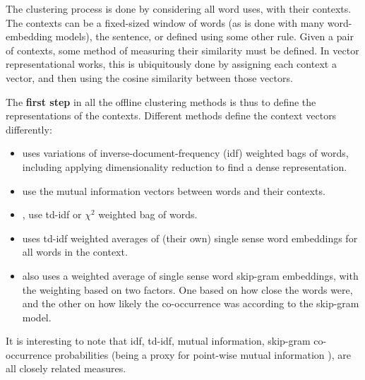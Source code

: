 \documentclass[12pt,parskip]{komatufte}
\begin{document}
The clustering process is done by considering all word uses, with their contexts.
The contexts can be a fixed-sized window of words (as is done with many word-embedding models), the sentence, or defined using some other rule.
Given a pair of contexts, some method of measuring their similarity must be defined.
In vector representational works, this is ubiquitously done by assigning each context a vector, and then using the cosine similarity between those vectors.

The \textbf{first step} in all the offline clustering methods is thus to define the representations of the contexts.
Different methods define the context vectors differently:
\begin{itemize}
\item \textcite{Schutze:1998wordsenseclustering} uses variations of inverse-document-frequency (idf) weighted bags of words, including applying dimensionality reduction to find a dense representation.
\item \textcite{pantel2002WSI} use the mutual information vectors between words and their contexts.
\item \textcite{Reisinger2010}, use td-idf or $\chi^2$ weighted bag of words.
\item {} uses td-idf weighted averages of (their own) single sense word embeddings for all words in the context.
\item  {} also uses a weighted average of single sense word skip-gram embeddings, with the weighting based on two factors. One based on how close the words were, and the other on how likely the co-occurrence was according to the skip-gram model.

\end{itemize}
It is interesting to note that idf, td-idf, mutual information, skip-gram co-occurrence probabilities (being a proxy for point-wise mutual information \parencite{levy2014neural}), are all closely related measures.
\end{document}
